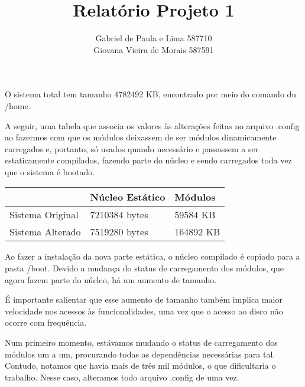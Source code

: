 \documentclass[12pt]{article}
\author{Gabriel de Paula e Lima  587710\\
        Giovana Vieira de Morais  587591}
\title{Relatório Projeto 1}
\begin{document}
\maketitle

O sistema total tem tamanho 4782492 KB, encontrado por meio do comando du
/home. 

A seguir, uma tabela que associa os valores às alterações feitas no arquivo
.config ao fazermos com que os módulos deixassem de ser módulos dinamicamente
carregados e, portanto, só usados quando necessário e passassem a ser estaticamente compilados, fazendo parte do núcleo
e sendo carregados toda vez que o sistema é bootado.

\begin{center}
    \begin{tabular}{ | l | l | l | }
        \hline
         & Núcleo Estático & Módulos \\
         \hline
        Sistema Original & 7210384 bytes & 59584 KB \\
        Sistema Alterado & 7519280 bytes & 164892 KB \\
        \hline
    \end{tabular}
\end{center}  

Ao fazer a instalação da nova parte estática, o núcleo compilado
é copiado para a pasta /boot. Devido a mudança do status de carregamento dos
módulos, que agora fazem parte do núcleo, há um aumento de tamanho.

É importante salientar que esse aumento de tamanho também implica maior
velocidade nos acessos às funcionalidades, uma vez que o acesso ao disco não ocorre com
frequência.

Num primeiro momento, estávamos mudando o status de carregamento dos módulos um
a um, procurando todas as dependências necessárias para tal. Contudo, notamos
que havia mais de três mil módulos, o que dificultaria o trabalho. Nesse caso,
alteramos todo arquivo .config de uma vez. 
\end{document}
